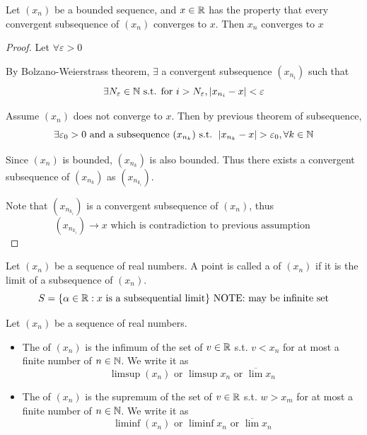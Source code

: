 \documentclass[a4paper,12pt]{article}
\begin{document}
\begin{theorem}
    Let \((x_n)\) be a bounded sequence, and \(x\in\mathbb{R}\) has the property that every convergent subsequence of \((x_n)\) converges to \(x\). 
    Then \(x_n \text{ converges to } x\)
    \begin{proof}
        Let \(\forall\varepsilon>0\)

        By Bolzano-Weierstrass theorem, \(\exists\) a convergent subsequence \((x_{n_i})\) such that
        \[\exists N_\varepsilon\in\mathbb{N} \text{ s.t. for } i>N_\varepsilon, \left\lvert x_{n_i}-x\right\rvert<\varepsilon\]
        
        Assume \((x_n)\) does not converge to \(x\). Then by previous theorem of subsequence,
        \[\exists \varepsilon_0 >0 \text{ and a subsequence }(x_{n_k}) \text{ s.t. }\left\lvert x_{n_k}-x\right\rvert>\varepsilon_0, \forall k\in\mathbb{N}\]
        
        Since \((x_n)\) is bounded, \((x_{n_k})\) is also bounded. Thus there exists a convergent subsequence of \((x_{n_k})\) as \((x_{n_{k_i}})\).

        Note that \((x_{n_{k_i}})\) is a convergent subsequence of \((x_n)\), thus 
        \[(x_{n_{k_i}})\rightarrow x\text{ which is contradiction to previous assumption }\]
    \end{proof}
\end{theorem}

\begin{definition}
    Let \((x_n)\) be a sequence of real numbers. A point is called a  of \((x_n)\) if it is the limit of a subsequence of \((x_n)\).
    \[S = \{\alpha \in\mathbb{R}:x\text{ is a subsequential limit}\}\text{ NOTE: may be infinite set}\]
\end{definition}

\begin{definition}
    Let \((x_n)\) be a sequence of real numbers.
    \begin{itemize}
        \item The  of \((x_n)\) is the infimum of the set of \(v\in\mathbb{R}\) s.t. \(v< x_n\) for at most a finite number of \(n\in\mathbb{N}\). We write it as
        \[\limsup(x_n)\text{ or }\limsup x_n\text{ or }\overline{\lim}x_n\]
        \item The  of \((x_n)\) is the supremum of the set of \(v\in\mathbb{R}\) s.t. \(w >x_m\) for at most a finite number of \(n\in\mathbb{N}\). We write it as
        \[\liminf(x_n)\text{ or }\liminf x_n\text{ or }\overline{\lim}x_n\]
    \end{itemize}
\end{definition}
\end{document}
